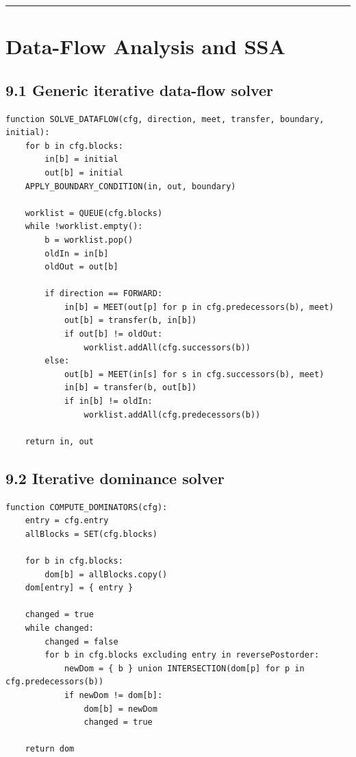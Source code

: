 \documentclass[10pt,letterpaper]{article}
\begin{document}
\medskip\hrule\medskip

\clearpage
\section{Data-Flow Analysis and SSA}

\subsection*{9.1 Generic iterative data-flow solver}

\begin{verbatim}
function SOLVE_DATAFLOW(cfg, direction, meet, transfer, boundary, initial):
    for b in cfg.blocks:
        in[b] = initial
        out[b] = initial
    APPLY_BOUNDARY_CONDITION(in, out, boundary)

    worklist = QUEUE(cfg.blocks)
    while !worklist.empty():
        b = worklist.pop()
        oldIn = in[b]
        oldOut = out[b]

        if direction == FORWARD:
            in[b] = MEET(out[p] for p in cfg.predecessors(b), meet)
            out[b] = transfer(b, in[b])
            if out[b] != oldOut:
                worklist.addAll(cfg.successors(b))
        else:
            out[b] = MEET(in[s] for s in cfg.successors(b), meet)
            in[b] = transfer(b, out[b])
            if in[b] != oldIn:
                worklist.addAll(cfg.predecessors(b))

    return in, out
\end{verbatim}

\subsection*{9.2 Iterative dominance solver}

\begin{verbatim}
function COMPUTE_DOMINATORS(cfg):
    entry = cfg.entry
    allBlocks = SET(cfg.blocks)

    for b in cfg.blocks:
        dom[b] = allBlocks.copy()
    dom[entry] = { entry }

    changed = true
    while changed:
        changed = false
        for b in cfg.blocks excluding entry in reversePostorder:
            newDom = { b } union INTERSECTION(dom[p] for p in cfg.predecessors(b))
            if newDom != dom[b]:
                dom[b] = newDom
                changed = true

    return dom
\end{verbatim}
\end{document}
